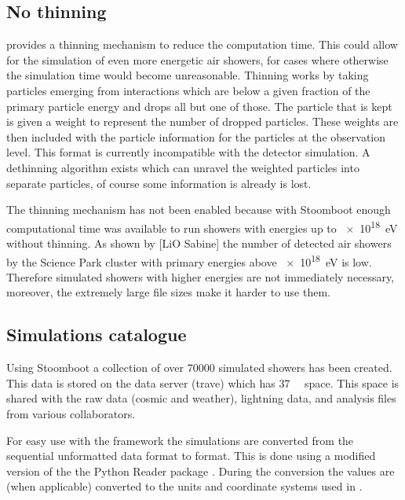 \begin{figure}
    \centering
    
    \caption{}
    \label{fig:simulations_shower_walltime}
\end{figure}


\subsection{No thinning}

\corsika provides a thinning mechanism to reduce the computation time. This could allow for the simulation of even more energetic air showers, for cases where otherwise the simulation time would become unreasonable. Thinning works by taking particles emerging from interactions which are below a given fraction of the primary particle energy and drops all but one of those. The particle that is kept is given a weight to represent the number of dropped particles. These weights are then included with the particle information for the particles at the observation level. This format is currently incompatible with the detector simulation. A dethinning algorithm exists \cite{stokes2012} which can unravel the weighted particles into separate particles, of course some information is already is lost.

The thinning mechanism has not been enabled because with Stoomboot enough computational time was available to run showers with energies up to \SI{e18}{\eV} without thinning. As shown by [LiO Sabine] the number of detected air showers by the Science Park cluster with primary energies above \SI{e18}{\eV} is low. Therefore simulated showers with higher energies are not immediately necessary, moreover, the extremely large file sizes make it harder to use them.


\subsection{Simulations catalogue}

Using Stoomboot a collection of over \num{70000} simulated showers has been created. This data is stored on the \hisparc data server (trave) which has \SI{37}{\tera\byte} space. This space is shared with the raw \hisparc data (cosmic and weather), \knmi lightning data, and analysis files from various \hisparc collaborators.

For easy use with the \sapphire framework the \corsika simulations are converted from the sequential unformatted \fortran data format to \hdf format. This is done using a modified version of the the Python \corsika Reader package \cite{gonzalez2011}. During the conversion the values are (when applicable) converted to the units and coordinate systems used in .

